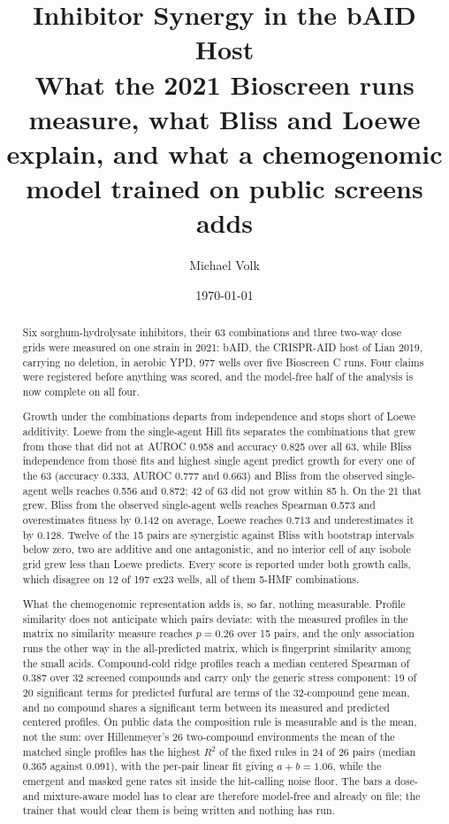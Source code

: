 \documentclass[10pt,a4paper]{article}
\title{\vspace{-1.5em}Inhibitor Synergy in the bAID Host\\
  {\large What the 2021 Bioscreen runs measure, what Bliss and Loewe explain,
   and what a chemogenomic model trained on public screens adds}}
\author{Michael Volk}
\date{\today}
\begin{document}
\maketitle
\thispagestyle{empty}

\begin{abstract}
\noindent
Six sorghum-hydrolysate inhibitors, their 63 combinations and three two-way dose grids
were measured on one strain in 2021: bAID, the CRISPR-AID host of Lian 2019, carrying no
deletion, in aerobic YPD, 977 wells over five Bioscreen C runs. Four claims were
registered before anything was scored, and the model-free half of the analysis is now
complete on all four.

Growth under the combinations departs from independence and stops short of Loewe
additivity. Loewe from the single-agent Hill fits separates the combinations that grew
from those that did not at AUROC 0.958 and accuracy 0.825 over all 63, while Bliss
independence from those fits and highest single agent predict growth for every one of
the 63 (accuracy 0.333, AUROC 0.777 and 0.663) and Bliss from the observed single-agent
wells reaches 0.556 and 0.872; 42 of 63 did not grow within 85 h. On the
21 that grew, Bliss from the observed single-agent wells reaches Spearman 0.573 and
overestimates fitness by 0.142 on average, Loewe reaches 0.713 and underestimates it by
0.128. Twelve of the 15 pairs are synergistic against Bliss with bootstrap intervals
below zero, two are additive and one antagonistic, and no interior cell of any isobole
grid grew less than Loewe predicts. Every score is reported under both growth calls,
which disagree on 12 of 197 ex23 wells, all of them 5-HMF combinations.

What the chemogenomic representation adds is, so far, nothing measurable. Profile
similarity does not anticipate which pairs deviate: with the measured profiles in the
matrix no similarity measure reaches $p = 0.26$ over 15 pairs, and the only association
runs the other way in the all-predicted matrix, which is fingerprint similarity among
the small acids. Compound-cold ridge profiles reach a median centered Spearman of 0.387
over 32 screened compounds and carry only the generic stress component: 19 of 20
significant terms for predicted furfural are terms of the 32-compound gene mean, and no
compound shares a significant term between its measured and predicted centered profiles.
On public data the composition rule is measurable and is the mean, not the sum: over
Hillenmeyer's 26 two-compound environments the mean of the matched single profiles has
the highest $R^2$ of the fixed rules in 24 of 26 pairs (median 0.365 against 0.091),
with the per-pair linear fit giving $a + b = 1.06$, while the emergent and masked gene
rates sit inside the hit-calling noise floor. The bars a dose- and mixture-aware model
has to clear are therefore model-free and already on file; the trainer that would clear
them is being written and nothing has run.
\end{abstract}

\vspace{0.5em}
\tccontents
\clearpage






\end{document}
